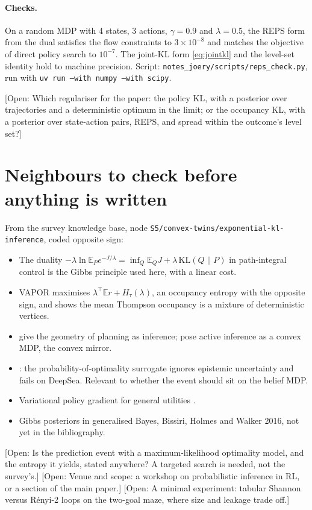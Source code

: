 \documentclass[10pt]{article}
\newcommand{\E}{\mathbb E}
\newcommand{\open}[1]{\textcolor{red!70!black}{[Open: #1]}}
\begin{document}
\paragraph{Checks.} On a random MDP with 4 states, 3 actions, $\gamma = 0.9$ and $\lambda = 0.5$, the REPS form from the dual satisfies the flow constraints to $3\times10^{-8}$ and matches the objective of direct policy search to $10^{-7}$. The joint-KL form \eqref{eq:jointkl} and the level-set identity hold to machine precision. Script: \texttt{notes\_joery/scripts/reps\_check.py}, run with \texttt{uv run --with numpy --with scipy}.

\open{Which regulariser for the paper: the policy KL, with a posterior over trajectories and a deterministic optimum in the limit; or the occupancy KL, with a posterior over state-action pairs, REPS, and spread within the outcome's level set?}

\section{Neighbours to check before anything is written}

From the survey knowledge base, node \texttt{S5/convex-twins/exponential-kl-inference}, coded opposite sign:
\begin{itemize}
\item The duality $-\lambda \ln \E_P e^{-J/\lambda} = \inf_Q \E_Q J + \lambda\,\mathrm{KL}(Q\|P)$ in path-integral control \citep{Theodorou-relative12,Kappen-path05} is the Gibbs principle used here, with a linear cost.
\item VAPOR \citep{Tarbouriech-probabilistic23} maximises $\lambda^\top \E r + H_\tau(\lambda)$, an occupancy entropy with the opposite sign, and shows the mean Thompson occupancy is a mixture of deterministic vertices.
\item \citet{Milosevic-dually26} give the geometry of planning as inference; \citet{Milosevic-active26} pose active inference as a convex MDP, the convex mirror.
\item \citet{ODonoghue-making20}: the probability-of-optimality surrogate ignores epistemic uncertainty and fails on DeepSea. Relevant to whether the event should sit on the belief MDP.
\item Variational policy gradient for general utilities \citep{Zhang-variational20}.
\item Gibbs posteriors in generalised Bayes, Bissiri, Holmes and Walker 2016, not yet in the bibliography.
\end{itemize}

\open{Is the prediction event with a maximum-likelihood optimality model, and the entropy it yields, stated anywhere? A targeted search is needed, not the survey's.}
\open{Venue and scope: a workshop on probabilistic inference in RL, or a section of the main paper.}
\open{A minimal experiment: tabular Shannon versus Rényi-2 loops on the two-goal maze, where size and leakage trade off.}


  {\newcommand{\surveybib}{notes_joery/joery_survey}}
  {\newcommand{\surveybib}{joery_survey}}

\end{document}
